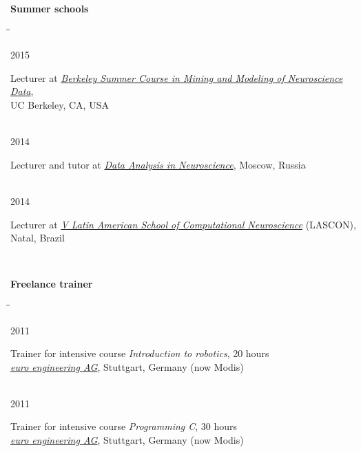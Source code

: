 \documentclass[10pt]{article} %
\newcommand{\tabbedblock}[1]{
\begin{tabbing}%
\hspace{2.2cm}\=\hspace{15cm}\=\kill%
#1%
\end{tabbing}
}
\newcommand{\tabitem}[2]{%
#1\>\begin{minipage}[t]{15cm}#2\end{minipage}\\[5pt]
}
\begin{document}
\textbf{Summer schools}
%
\tabbedblock{
  \tabitem
  {2015}
  {Lecturer at \href{https://crcns.org/course}{\textit{Berkeley Summer Course in Mining and Modeling of Neuroscience Data}},\\UC Berkeley, CA, USA}
  \tabitem
  {2014}
  {Lecturer and tutor at \href{http://www.neurobiotech.ru/ru/dataNS}{\textit{Data Analysis in Neuroscience}}, Moscow, Russia}
  \tabitem
  {2014}
  {Lecturer at \href{http://sisne.org/previous-editions/lascon-v/?lang=en}{\textit{V Latin American School of Computational Neuroscience}} (LASCON), Natal, Brazil}
}

\textbf{Freelance trainer}
%
\tabbedblock{
%
\tabitem
{2011}
{%
Trainer for intensive course \textit{Introduction to robotics}, 20 hours\\
\textit{\href{https://www.ee-ag.com/}{euro engineering AG}}, Stuttgart, Germany (now Modis)
}
%
\tabitem
{2011}
{%
Trainer for intensive course \textit{Programming C}, 30 hours\\
\textit{\href{https://www.ee-ag.com/}{euro engineering AG}}, Stuttgart, Germany (now Modis)
}
}

\end{document}
